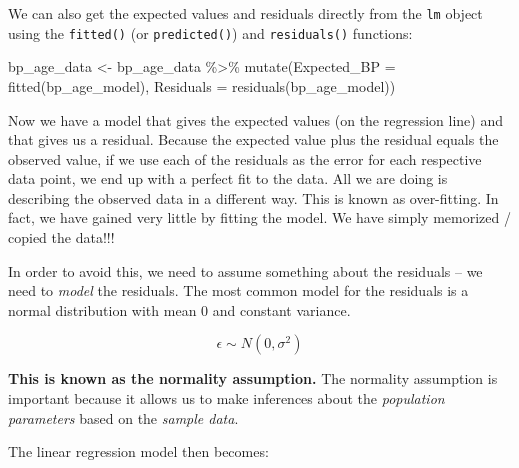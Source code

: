 \documentclass[
  letterpaper,
  8pt,
  a4paper]{book}
\newenvironment{Shaded}{\begin{snugshade}}{\end{snugshade}}
\newcommand{\AttributeTok}[1]{\textcolor[rgb]{0.40,0.45,0.13}{#1}}
\newcommand{\FunctionTok}[1]{\textcolor[rgb]{0.28,0.35,0.67}{#1}}
\newcommand{\NormalTok}[1]{\textcolor[rgb]{0.00,0.23,0.31}{#1}}
\newcommand{\OtherTok}[1]{\textcolor[rgb]{0.00,0.23,0.31}{#1}}
\newcommand{\SpecialCharTok}[1]{\textcolor[rgb]{0.37,0.37,0.37}{#1}}
\begin{document}
\begin{tcolorbox}[enhanced jigsaw, arc=.35mm, bottomrule=.15mm, bottomtitle=1mm, breakable, colback=white, colbacktitle=quarto-callout-tip-color!10!white, colframe=quarto-callout-tip-color-frame, coltitle=black, left=2mm, leftrule=.75mm, opacityback=0, opacitybacktitle=0.6, rightrule=.15mm, title=\textcolor{quarto-callout-tip-color}{\faLightbulb}\hspace{0.5em}{Tip}, titlerule=0mm, toprule=.15mm, toptitle=1mm]

We can also get the expected values and residuals directly from the
\texttt{lm} object using the \texttt{fitted()} (or \texttt{predicted()})
and \texttt{residuals()} functions:

\begin{Shaded}
\begin{Highlighting}[]
\NormalTok{bp\_age\_data }\OtherTok{\textless{}{-}}\NormalTok{ bp\_age\_data }\SpecialCharTok{\%\textgreater{}\%}
  \FunctionTok{mutate}\NormalTok{(}\AttributeTok{Expected\_BP =} \FunctionTok{fitted}\NormalTok{(bp\_age\_model),}
         \AttributeTok{Residuals =} \FunctionTok{residuals}\NormalTok{(bp\_age\_model))}
\end{Highlighting}
\end{Shaded}

\end{tcolorbox}

Now we have a model that gives the expected values (on the regression
line) and that gives us a residual. Because the expected value plus the
residual equals the observed value, if we use each of the residuals as
the error for each respective data point, we end up with a perfect fit
to the data. All we are doing is describing the observed data in a
different way. This is known as over-fitting. In fact, we have gained
very little by fitting the model. We have simply memorized / copied the
data!!!

In order to avoid this, we need to assume something about the residuals
-- we need to \emph{model} the residuals. The most common model for the
residuals is a normal distribution with mean 0 and constant variance.

\[\epsilon \sim N(0,\sigma^2)\]

\textbf{This is known as the normality assumption.} The normality
assumption is important because it allows us to make inferences about
the \emph{population parameters} based on the \emph{sample data}.

The linear regression model then becomes:
\end{document}
